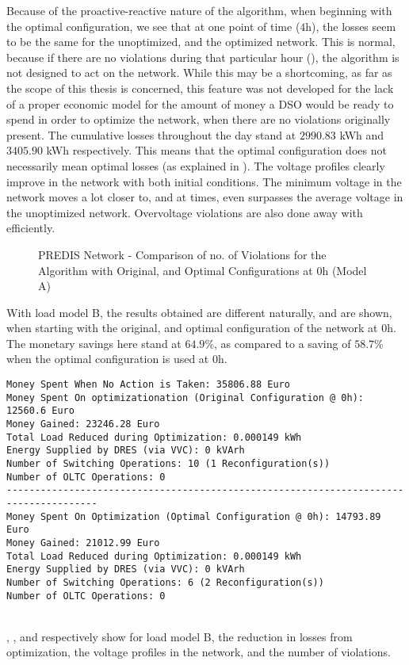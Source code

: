 Because of the proactive-reactive nature of the algorithm, when beginning with the optimal configuration, we see that at one point of time ($4$h), the losses seem to be the same for the unoptimized, and the optimized network. This is normal, because if there are no violations during that particular hour (), the algorithm is not designed to act on the network. While this may be a shortcoming, as far as the scope of this thesis is concerned, this feature was not developed for the lack of a proper economic model for the amount of money a DSO would be ready to spend in order to optimize the network, when there are no violations originally present. The cumulative losses throughout the day stand at $2990.83$ kWh and $3405.90$ kWh respectively. This means that the optimal configuration does not necessarily mean optimal losses (as explained in ). The voltage profiles clearly improve in the network with both initial conditions. The minimum voltage in the network moves a lot closer to, and at times, even surpasses the average voltage in the unoptimized network. Overvoltage violations are also done away with efficiently.\\

\begin{figure}[!h]
\centering
    \setlength\figureheight{5cm}
    \setlength\figurewidth{14cm}
	
	\caption{PREDIS Network - Comparison of no. of Violations for the Algorithm with Original, and Optimal Configurations at $0$h (Model A)}
\end{figure}

With load model B, the results obtained are different naturally, and are shown, when starting with the original, and optimal configuration of the network at $0$h. The monetary savings here stand at $64.9$\%, as compared to a saving of $58.7$\% when the optimal configuration is used at $0$h.
\begin{lstlisting}[title=Console Output With Load Model B]
Money Spent When No Action is Taken: 35806.88 Euro
Money Spent On optimizationation (Original Configuration @ 0h): 12560.6 Euro
Money Gained: 23246.28 Euro
Total Load Reduced during Optimization: 0.000149 kWh
Energy Supplied by DRES (via VVC): 0 kVArh
Number of Switching Operations: 10 (1 Reconfiguration(s))
Number of OLTC Operations: 0
--------------------------------------------------------------------------------------
Money Spent On Optimization (Optimal Configuration @ 0h): 14793.89 Euro
Money Gained: 21012.99 Euro
Total Load Reduced during Optimization: 0.000149 kWh
Energy Supplied by DRES (via VVC): 0 kVArh
Number of Switching Operations: 6 (2 Reconfiguration(s))
Number of OLTC Operations: 0
\end{lstlisting}
\ \\
, , and  respectively show for load model B, the reduction in losses from optimization, the voltage profiles in the network, and the number of violations.

